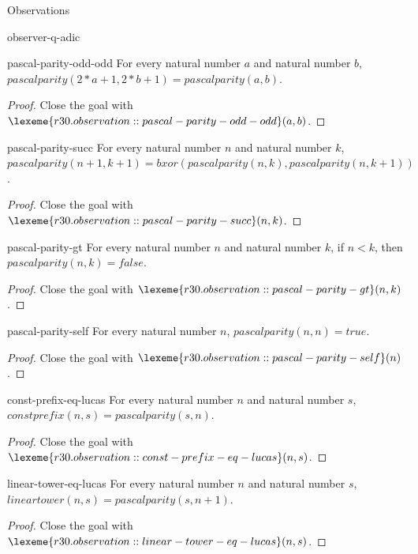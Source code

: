 \begin{lexlean}{Observations}
\begin{section}{observer-q-adic}
\begin{theorem}{pascal-parity-odd-odd}
For every natural number \(a\) and natural number \(b\), \(pascalparity(2 * a + 1, 2 * b + 1) = pascalparity(a, b)\).
\begin{proof}
Close the goal with \(\lexeme{r30.observation::pascal-parity-odd-odd}(a, b)\).
\end{proof}
\end{theorem}

\begin{theorem}{pascal-parity-succ}
For every natural number \(n\) and natural number \(k\), \(pascalparity(n + 1, k + 1) = bxor(pascalparity(n, k), pascalparity(n, k + 1))\).
\begin{proof}
Close the goal with \(\lexeme{r30.observation::pascal-parity-succ}(n, k)\).
\end{proof}
\end{theorem}

\begin{theorem}{pascal-parity-gt}
For every natural number \(n\) and natural number \(k\), if \(n < k\), then \(pascalparity(n, k) = false\).
\begin{proof}
Close the goal with \(\lexeme{r30.observation::pascal-parity-gt}(n, k)\).
\end{proof}
\end{theorem}

\begin{theorem}{pascal-parity-self}
For every natural number \(n\), \(pascalparity(n, n) = true\).
\begin{proof}
Close the goal with \(\lexeme{r30.observation::pascal-parity-self}(n)\).
\end{proof}
\end{theorem}

\begin{theorem}{const-prefix-eq-lucas}
For every natural number \(n\) and natural number \(s\), \(constprefix(n, s) = pascalparity(s, n)\).
\begin{proof}
Close the goal with \(\lexeme{r30.observation::const-prefix-eq-lucas}(n, s)\).
\end{proof}
\end{theorem}

\begin{theorem}{linear-tower-eq-lucas}
For every natural number \(n\) and natural number \(s\), \(lineartower(n, s) = pascalparity(s, n + 1)\).
\begin{proof}
Close the goal with \(\lexeme{r30.observation::linear-tower-eq-lucas}(n, s)\).
\end{proof}
\end{theorem}


\end{section}
\end{lexlean}
